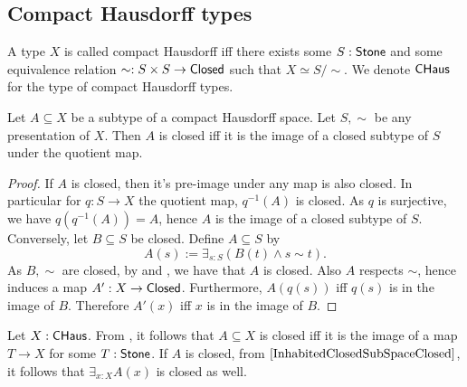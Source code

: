 \subsection{Compact Hausdorff types}
\begin{definition}
  A type $X$ is called compact Hausdorff iff there exists some $S:\mathsf{Stone}$ and some 
  equivalence relation $\sim:S \times S \to \mathsf{Closed}$ such that $X \simeq S / \sim$. 
  We denote $\mathsf{CHaus}$ for the type of compact Hausdorff types. 
\end{definition} 

\begin{lemma}\label{CompactHausdorffClosed}
Let $A\subseteq X$ be a subtype of a compact Hausdorff space. 
Let $S, \sim$ be any presentation of $X$. 
Then $A$ is closed iff it is the image of a closed subtype of $S$ under the quotient map. 
\end{lemma}
\begin{proof}
  If $A$ is closed, then it's pre-image under any map is also closed. 
  In particular for $q:S\to X$ the quotient map, $q^{-1}(A)$ is closed. 
  As $q$ is surjective, we have $q(q^{-1}(A)) = A$,
  hence $A$ is the image of a closed subtype of $S$. 
  Conversely, let $B\subseteq S$ be closed. 
  Define $A\subseteq S$ by 
  $$A(s) := \exists_{s:S} (B(t) \wedge s \sim t).$$
  As $B, \sim$ are closed, by  and , 
  we have that $A$  is closed. 
  Also $A$ respects $\sim$, hence induces a map $A': X\to \mathsf{Closed}$.
  Furthermore, $A(q(s))$ iff $q(s)$ is in the image of $B$. 
  Therefore $A'(x)$ iff $x$ is in the image of $B$. 
\end{proof}
\begin{remark}\label{InhabitedClosedSubSpaceClosedCHaus}
  Let $X:\mathsf{CHaus}$.
  From , it follows that $A\subseteq X$ is closed iff it is the image of a map 
  $T\to X$ for some $T:\mathsf{Stone}$. 
  If $A$ is closed, from $\Cref{InhabitedClosedSubSpaceClosed}$, it follows that $\exists_{x:X} A(x)$ is closed as well. 
\end{remark}
